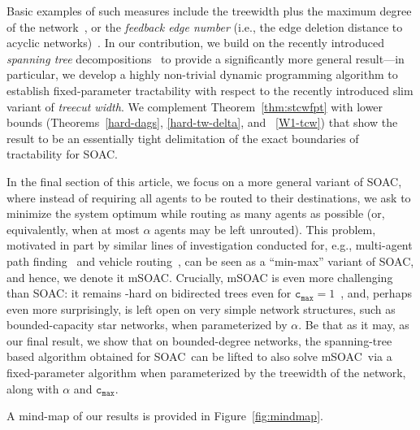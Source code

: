 \documentclass[letterpaper]{article} %
\newcommand{\problem}{{\sc SOAC}\xspace} %
\newcommand{\mproblem}{{\sc mSOAC}\xspace} %
\newcommand{\cmax}{\mathtt{c_{max}}}
\begin{document}
Basic examples of such measures include the treewidth plus the maximum degree of the network~\cite{OrdyniakS13,GozupekOPSS17}, or the
\emph{feedback edge number} (i.e., the edge deletion distance to acyclic networks)~\cite{KoanaKNNZ21,FuchsleMNR22}. In our contribution, we build on the recently introduced \emph{spanning tree} decompositions~\cite{GanianK21,GanianK22} to provide a significantly more general result---in particular, we develop
a highly non-trivial dynamic programming algorithm to establish fixed-parameter tractability with respect to the recently introduced slim variant of \emph{treecut width}. We complement Theorem~\ref{thm:stcwfpt} with lower bounds (Theorems~\ref{hard-dags}, \ref{hard-tw-delta}, and ~\ref{W1-tcw}) that show the result to be an essentially tight delimitation of the exact boundaries of tractability for \problem.

In the final section of this article, we focus on a more general variant of \problem, where instead of requiring all agents to be routed to their destinations, we ask to minimize the system optimum while routing as many agents as possible (or, equivalently, when at most $\alpha$ agents may be left unrouted).
This problem, motivated in part by similar lines of investigation conducted for, e.g., multi-agent path finding~\cite{Huang0KD22} and vehicle routing~\cite{PhamHVN22,AbuMonsharA22}, can be seen as a ``min-max'' variant of \problem, and hence, we denote it \mproblem. Crucially, \mproblem
is even more challenging than \problem: it remains \NP-hard on bidirected trees even for $\cmax=1$~\cite{ErlebachJansen01}, and, perhaps even more surprisingly, is left open on very simple network structures, such as bounded-capacity star networks, when parameterized by $\alpha$. Be that as it may, as our final result, we show that on bounded-degree networks, the spanning-tree based algorithm obtained for \problem\ can be lifted to also solve \mproblem\ via a fixed-parameter algorithm when parameterized by the treewidth of the network, along with $\alpha$ and $\cmax$.

A mind-map of our results is provided in Figure~\ref{fig:mindmap}.
\end{document}
